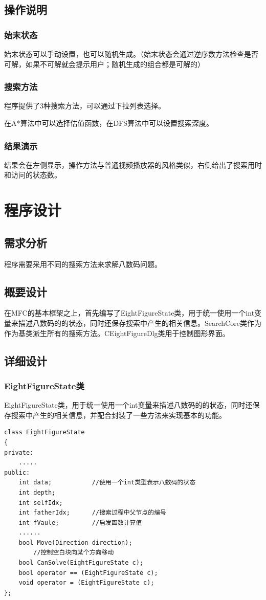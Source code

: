 \documentclass[12pt,a4paper]{article}
\begin{document}
\subsection{操作说明}
\subsubsection{始末状态}
始末状态可以手动设置，也可以随机生成。（始末状态会通过逆序数方法检查是否可解，如果不可解就会提示用户；随机生成的组合都是可解的）
\subsubsection{搜索方法}
程序提供了3种搜索方法，可以通过下拉列表选择。\par
在A*算法中可以选择估值函数，在DFS算法中可以设置搜索深度。
\subsubsection{结果演示}
结果会在左侧显示，操作方法与普通视频播放器的风格类似，右侧给出了搜索用时和访问的状态数。
\section{程序设计}
\subsection{需求分析}
程序需要采用不同的搜索方法来求解八数码问题。
\subsection{概要设计}
在MFC的基本框架之上，首先编写了EightFigureState类，用于统一使用一个int变量来描述八数码的的状态，同时还保存搜索中产生的相关信息。SearchCore类作为作为基类派生所有的搜索方法。CEightFigureDlg类用于控制图形界面。
\subsection{详细设计}
\subsubsection{EightFigureState类}
EightFigureState类，用于统一使用一个int变量来描述八数码的的状态，同时还保存搜索中产生的相关信息，并配合封装了一些方法来实现基本的功能。
\begin{lstlisting}
class EightFigureState
{
private:
   	.....
public:
    int data;			//使用一个int类型表示八数码的状态
    int depth;
    int selfIdx;
    int fatherIdx;		//搜索过程中父节点的编号
    int fVaule;			//启发函数计算值
    ......
    bool Move(Direction direction);		
    	//控制空白块向某个方向移动
    bool CanSolve(EightFigureState c);
    bool operator == (EightFigureState c);
    void operator = (EightFigureState c);
};
\end{lstlisting}
\end{document}

